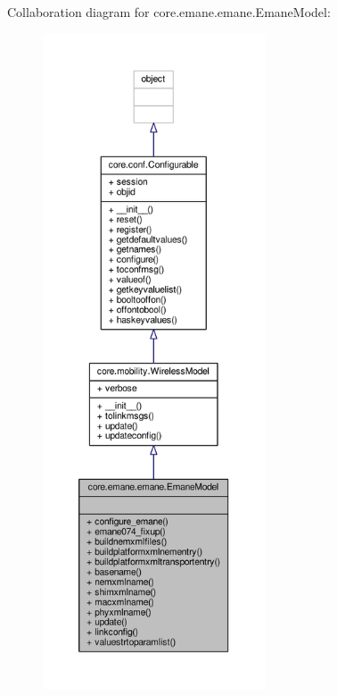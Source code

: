 Collaboration diagram for core.\+emane.\+emane.\+Emane\+Model\+:
\nopagebreak
\begin{figure}[H]
\begin{center}
\leavevmode
\includegraphics[height=550pt]{classcore_1_1emane_1_1emane_1_1_emane_model__coll__graph}
\end{center}
\end{figure}
